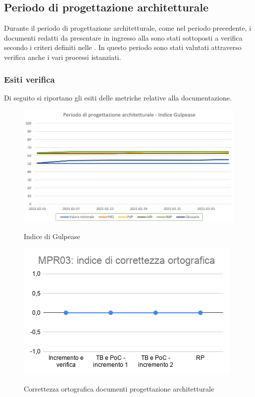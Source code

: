 \subsection{Periodo di progettazione architetturale} \label{ResocontoPArchitetturale}
Durante il periodo di progettazione architetturale, come nel periodo precedente, i documenti redatti da presentare in ingresso alla  sono stati sottoposti a verifica secondo i criteri definiti nelle . In questo periodo sono stati valutati attraverso verifica anche i vari processi istanziati.
\subsubsection{Esiti verifica}
Di seguito si riportano gli esiti delle metriche relative alla documentazione.
\begin{figure}[h]
	\centering
	\includegraphics[scale=0.5]{Immagini/GulpeaseProgettazioneArchitetturale}\\
	\caption{Indice di Gulpease}
	\label{fig:GulpeasePArchitetturale}
\end{figure}
\begin{figure}[h]
	\centering
	\includegraphics[scale=0.6]{Immagini/MPR03_cortografica}\\
	\caption{Correttezza ortografica documenti progettazione architetturale}
	\label{fig:CortOrtograficaPArchitetturale}
\end{figure}
